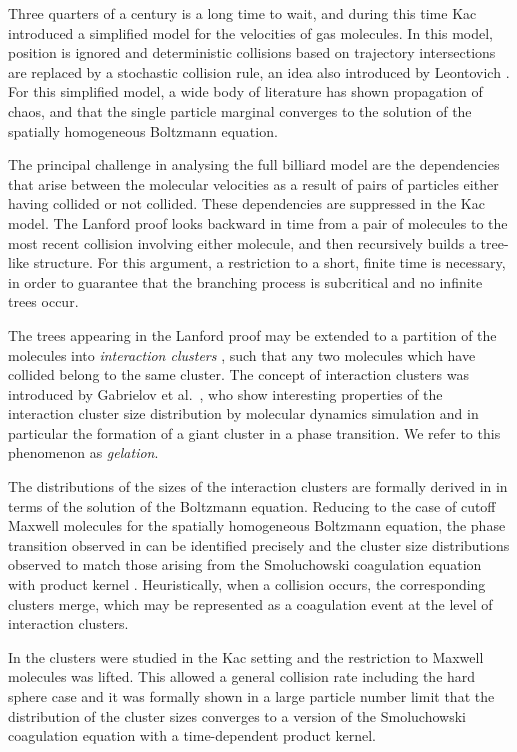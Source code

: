 \documentclass[11pt, notitlepage]{article}
\begin{document}
Three quarters of a century is a long time to wait, and during this time Kac \cite{K56} introduced a simplified model for the velocities of gas molecules.
In this model, position is ignored and deterministic collisions based on trajectory intersections are replaced by a stochastic collision rule, an idea also introduced by Leontovich \cite{L35}.
For this simplified model, a wide body of literature \cite{McKean,Grunbaum,Sznitman,MischlerMouhot,N16} has shown propagation of chaos, and that the single particle marginal converges to the solution of the spatially homogeneous Boltzmann equation.

The principal challenge in analysing the full billiard model are the dependencies that arise between the molecular velocities as a result of pairs of particles either having collided or not collided.
These dependencies are suppressed in the Kac model.
The Lanford proof looks backward in time from a pair of molecules to the most recent collision involving either molecule, and then recursively builds a tree-like structure. For this argument, a restriction to a short, finite time is necessary, in order to guarantee that the branching process is subcritical and no infinite trees occur. 

The trees appearing in the Lanford proof may be extended to a partition of the molecules into \emph{interaction clusters} \cite{PSW16}, such that any two molecules which have collided belong to the same cluster.  
The concept of interaction clusters was introduced by Gabrielov et al.~\cite{GKSZ08}, who show interesting properties of the interaction cluster size distribution by molecular dynamics simulation and in particular the formation of a giant cluster in a phase transition. We refer to this phenomenon as \emph{gelation}. 



The distributions of the sizes of the interaction clusters are formally derived in \cite{PSW16} in terms of the solution of the Boltzmann equation.
Reducing to the case of cutoff Maxwell molecules for the spatially homogeneous Boltzmann equation, the phase transition observed in \cite{GKSZ08} can be identified precisely and the cluster size distributions observed to match those arising from the Smoluchowski coagulation equation with product kernel \cite{L78,A99,PSW16}. Heuristically, when a collision occurs, the corresponding clusters merge, which may be represented as a coagulation event at the level of interaction clusters.

In \cite{PSW17} the clusters were studied in the Kac setting and the restriction to Maxwell molecules was lifted.
This allowed a general collision rate including the hard sphere case and it was formally shown in a large particle number limit that the distribution of the cluster sizes converges to a version of the Smoluchowski coagulation equation with a time-dependent product kernel. 
\end{document}
